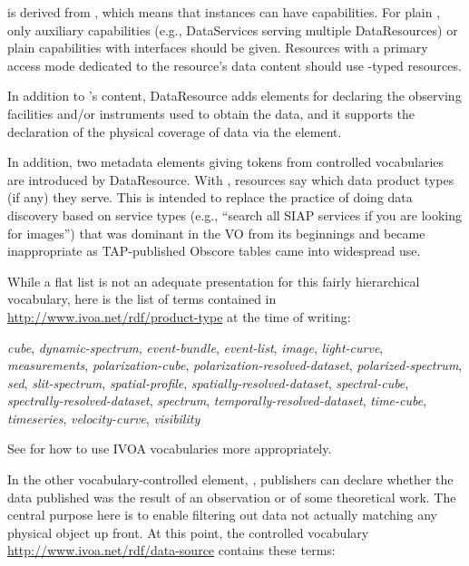 \documentclass[11pt,a4paper]{ivoa}
\begin{document}
 is derived from , which means
that instances can have
capabilities.  For plain , only auxiliary capabilities
(e.g., DataServices serving multiple DataResources) or plain capabilities
with  interfaces should be given.  Resources with a
primary access mode dedicated to the resource's data content should use
-typed resources.

In addition to 's content, DataResource adds
elements for declaring the observing facilities and/or instruments used
to obtain the data, and it supports the declaration of
the physical coverage of data via the 
element.

In addition, two metadata elements giving tokens from controlled
vocabularies are introduced by DataResource.  With
, resources say which data product types (if
any) they serve.  This is intended to replace the practice of doing data
discovery based on service types (e.g., ``search all SIAP services if
you are looking for images'') that was dominant in the VO from its
beginnings and became inappropriate as TAP-published Obscore tables
\citep{2017ivoa.spec.0509L} came into widespread use.

While a flat list is not an adequate presentation for this fairly
hierarchical vocabulary, here is the list of terms contained in
\url{http://www.ivoa.net/rdf/product-type} at the time of writing:

\textsl{cube},
\textsl{dynamic-spectrum},
\textsl{event-bundle},
\textsl{event-list},
\textsl{image},
\textsl{light-curve},
\textsl{measurements},
\textsl{polarization-cube},
\textsl{polarization-resolved-dataset},
\textsl{polarized-spectrum},
\textsl{sed},
\textsl{slit-spectrum},
\textsl{spatial-profile},
\textsl{spatially-resolved-dataset},
\textsl{spectral-cube},
\textsl{spectrally-resolved-dataset},
\textsl{spectrum},
\textsl{temporally-resolved-dataset},
\textsl{time-cube},
\textsl{timeseries},
\textsl{velocity-curve},
\textsl{visibility}

See \citet{2023ivoa.spec.0206D} for how to use IVOA vocabularies more
appropriately.

In the other vocabulary-controlled element, ,
publishers can declare whether the data published was the result of an
observation or of some theoretical work.  The central purpose here is to
enable filtering out data not actually matching any physical object up
front.  At this point, the controlled vocabulary
\url{http://www.ivoa.net/rdf/data-source} contains these terms:
\end{document}
